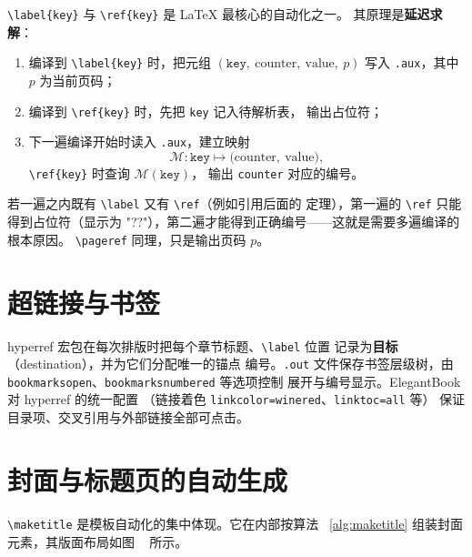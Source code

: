 \verb|\label{key}| 与 \verb|\ref{key}| 是 LaTeX 最核心的自动化之一。
其原理是\textbf{延迟求解}：

\begin{enumerate}
  \item 编译到 \verb|\label{key}| 时，把元组
        $(\texttt{key},\ \mathrm{counter},\ \mathrm{value},\ p)$
        写入 \texttt{.aux}，其中 $p$ 为当前页码；
  \item 编译到 \verb|\ref{key}| 时，先把 \texttt{key} 记入待解析表，
        输出占位符；
  \item 下一遍编译开始时读入 \texttt{.aux}，建立映射
        \begin{equation}
          \mathcal{M}: \texttt{key} \longmapsto
          \bigl(\mathrm{counter},\ \mathrm{value}\bigr),
          \label{eq:auxmap}
        \end{equation}
        \verb|\ref{key}| 时查询 $\mathcal{M}(\texttt{key})$，
        输出 \texttt{counter} 对应的编号。
\end{enumerate}

若一遍之内既有 \verb|\label| 又有 \verb|\ref|（例如引用后面的
定理），第一遍的 \verb|\ref| 只能得到占位符（显示为
"??"），第二遍才能得到正确编号——这就是需要多遍编译的根本原因。
\verb|\pageref| 同理，只是输出页码 $p$。

\section{超链接与书签}

hyperref 宏包在每次排版时把每个章节标题、\verb|\label| 位置
记录为\textbf{目标}（destination），并为它们分配唯一的锚点
编号。\texttt{.out} 文件保存书签层级树，由
\texttt{bookmarksopen}、\texttt{bookmarksnumbered} 等选项控制
展开与编号显示。ElegantBook 对 hyperref 的统一配置
（链接着色 \texttt{linkcolor=winered}、\texttt{linktoc=all} 等）
保证目录项、交叉引用与外部链接全部可点击。

\section{封面与标题页的自动生成}

\verb|\maketitle| 是模板自动化的集中体现。它在内部按算法
~\ref{alg:maketitle} 组装封面元素，其版面布局如图
~ 所示。

